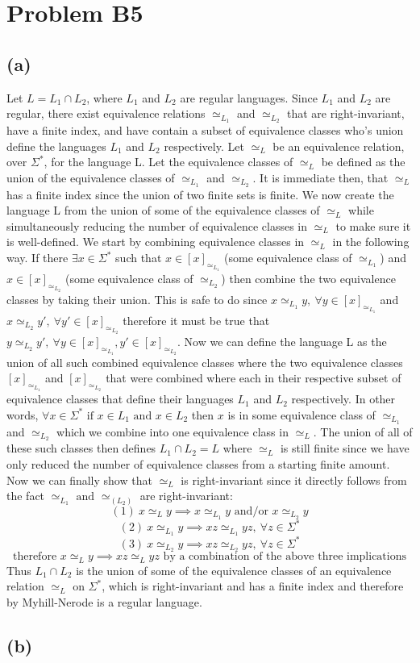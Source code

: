 \documentclass[12pt]{article}
\begin{document}
\pagestyle{plain}

\section*{Problem B5}
\subsection*{(a)}
Let $L = L_1 \cap L_2$, where $L_1$ and $L_2$ are regular languages. Since
$L_1$ and $L_2$ are regular, there exist equivalence relations $\simeq_{L_1}$
and $\simeq_{L_2}$ that are right-invariant, have a finite index, and have
contain a subset of equivalence classes who's union define the languages
$L_1$ and $L_2$ respectively. Let $\simeq_L$ be an equivalence relation, over
$\Sigma^*$, for the language L. Let the equivalence classes of $\simeq_L$
be defined as the union of the equivalence classes of $\simeq_{L_1}$ and
$\simeq_{L_2}$. It is immediate then, that $\simeq_L$ has a finite index since
the union of two finite sets is finite. We now create the language L from the
union of some of the equivalence classes of $\simeq_L$ while simultaneously
reducing the number of equivalence classes in $\simeq_L$ to make sure it is
well-defined. We start by combining equivalence classes in $\simeq_L$ in the
following way. If there $\exists x \in \Sigma^*$ such that
$x \in [x]_{\simeq_{L_1}}$ (some equivalence class of $\simeq_{L_1}$) and
$x \in [x]_{\simeq_{L_2}}$ (some equivalence class of $\simeq_{L_2}$)
then combine the two equivalence classes by taking their union. This is safe to
do since $x \simeq_{L_1} y,\ \forall y \in [x]_{\simeq_{L_1}}$ and
$x \simeq_{L_2} y',\ \forall y' \in [x]_{\simeq_{L_2}}$ therefore it must be true
that $y \simeq_{L_2} y',\ \forall y \in [x]_{\simeq_{L_1}},
y' \in [x]_{\simeq_{L_2}}$. Now we can define the language L as the union of all
such combined equivalence classes where the two equivalence classes
$[x]_{\simeq_{L_1}}$ and $[x]_{\simeq_{L_2}}$ that were combined where each in
their respective subset of equivalence classes that define their languages
$L_1$ and $L_2$ respectively. In other words, $\forall x \in \Sigma^*
\text{ if } x \in L_1 \text{ and } x \in L_2$ then $x$ is in some equivalence
class of $\simeq_{L_1}$ and $\simeq_{L_2}$ which we combine into one equivalence
class in $\simeq_L$. The union of all of these such classes then defines
$L_1 \cap L_2 = L$ where $\simeq_L$ is still finite since we have only reduced
the number of equivalence classes from a starting finite amount. Now we can
finally show that $\simeq_L$ is right-invariant since it directly follows from
the fact $\simeq_{L_1} \text{ and } \simeq_(L_2)$ are right-invariant:
$$(1)\ x \simeq_L y \implies x \simeq_{L_1} y \text{ and/or } x \simeq_{L_2} y$$
$$(2)\ x \simeq_{L_1} y \implies xz \simeq_{L_1} yz,\ \forall z \in \Sigma^*$$
$$(3)\ x \simeq_{L_2} y \implies xz \simeq_{L_2} yz,\ \forall z \in \Sigma^*$$
$$\text{therefore } x \simeq_L y \implies xz \simeq_L yz \text{ by a combination
of the above three implications}$$
Thus $L_1 \cap L_2$ is the union of some of the equivalence classes of an
equivalence relation $\simeq_L$ on $\Sigma^*$, which is right-invariant and has
a finite index and therefore by Myhill-Nerode is a regular language.
\subsection*{(b)}
\end{document}
